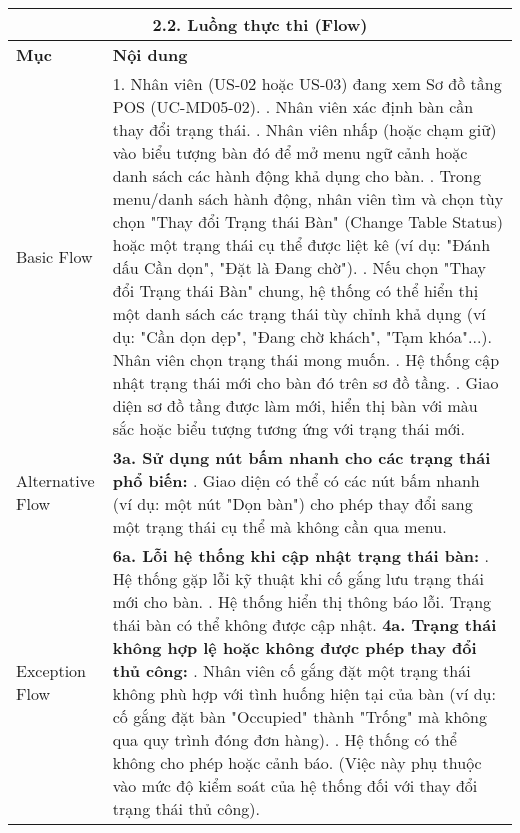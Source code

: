 \begin{longtable}{|m{4cm}|p{11cm}|}
\hline
\multicolumn{2}{|c|}{\textbf{2.2. Luồng thực thi (Flow)}} \\
\hline
\textbf{Mục} & \textbf{Nội dung} \\
\hline
Basic Flow & 1. Nhân viên (US-02 hoặc US-03) đang xem Sơ đồ tầng POS (UC-MD05-02). \newline 2. Nhân viên xác định bàn cần thay đổi trạng thái. \newline 3. Nhân viên nhấp (hoặc chạm giữ) vào biểu tượng bàn đó để mở menu ngữ cảnh hoặc danh sách các hành động khả dụng cho bàn. \newline 4. Trong menu/danh sách hành động, nhân viên tìm và chọn tùy chọn "Thay đổi Trạng thái Bàn" (Change Table Status) hoặc một trạng thái cụ thể được liệt kê (ví dụ: "Đánh dấu Cần dọn", "Đặt là Đang chờ"). \newline 5. Nếu chọn "Thay đổi Trạng thái Bàn" chung, hệ thống có thể hiển thị một danh sách các trạng thái tùy chỉnh khả dụng (ví dụ: "Cần dọn dẹp", "Đang chờ khách", "Tạm khóa"...). Nhân viên chọn trạng thái mong muốn. \newline 6. Hệ thống cập nhật trạng thái mới cho bàn đó trên sơ đồ tầng. \newline 7. Giao diện sơ đồ tầng được làm mới, hiển thị bàn với màu sắc hoặc biểu tượng tương ứng với trạng thái mới. \\
\hline
Alternative Flow & \textbf{3a. Sử dụng nút bấm nhanh cho các trạng thái phổ biến:} \newline    1. Giao diện có thể có các nút bấm nhanh (ví dụ: một nút "Dọn bàn") cho phép thay đổi sang một trạng thái cụ thể mà không cần qua menu. \\
\hline
Exception Flow & \textbf{6a. Lỗi hệ thống khi cập nhật trạng thái bàn:} \newline    1. Hệ thống gặp lỗi kỹ thuật khi cố gắng lưu trạng thái mới cho bàn. \newline    2. Hệ thống hiển thị thông báo lỗi. Trạng thái bàn có thể không được cập nhật. \newline \textbf{4a. Trạng thái không hợp lệ hoặc không được phép thay đổi thủ công:} \newline    1. Nhân viên cố gắng đặt một trạng thái không phù hợp với tình huống hiện tại của bàn (ví dụ: cố gắng đặt bàn "Occupied" thành "Trống" mà không qua quy trình đóng đơn hàng). \newline    2. Hệ thống có thể không cho phép hoặc cảnh báo. (Việc này phụ thuộc vào mức độ kiểm soát của hệ thống đối với thay đổi trạng thái thủ công). \\

\end{longtable}
